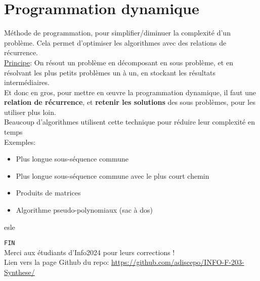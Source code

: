 \documentclass[10pt]{article}
\begin{document}
\section{Programmation dynamique}
Méthode de programmation, pour simplifier/diminuer la complexité d’un problème. Cela permet d’optimiser les algorithmes avec des relations de récurrence.
\\\underline{Principe}: On résout un problème en décomposant en sous problème, et en résolvant les plus petits problèmes un à un, en stockant les résultats intermédiaires.
\\Et donc en gros, pour mettre en œuvre la programmation dynamique, il faut une \textbf{relation de récurrence}, et \textbf{retenir les solutions} des sous problèmes, pour les utiliser plus loin.
\\Beaucoup d'algorithmes utilisent cette technique pour réduire leur complexité en temps
\\Exemples:
\begin{itemize}
\item Plus longue sous-séquence commune
\item Plus longue sous-séquence commune avec le plus court chemin
\item Produits de matrices
\item Algorithme pseudo-polynomiaux (sac à dos)
\end{itemize}esle

\verb|FIN|\\
Merci aux étudiants d'Info2024 pour leurs corrections !
\\Lien vers la page Github du repo: \url{https://github.com/adiscepo/INFO-F-203-Synthese/}
\end{document}
